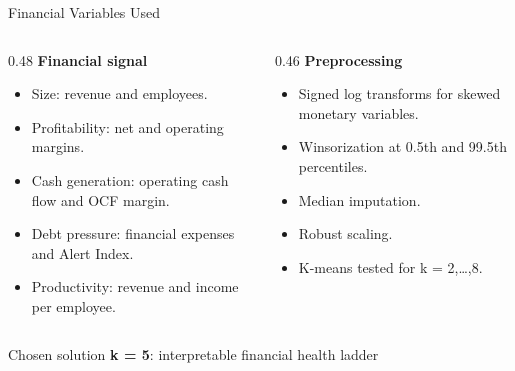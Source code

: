 \documentclass[aspectratio=169,10pt]{beamer}
\begin{document}
\begin{frame}{Financial Variables Used}
  \begin{columns}[T,totalwidth=\textwidth]
    \begin{column}{0.48\textwidth}
      \textbf{Financial signal}
      \begin{itemize}
        \item Size: revenue and employees.
        \item Profitability: net and operating margins.
        \item Cash generation: operating cash flow and OCF margin.
        \item Debt pressure: financial expenses and Alert Index.
        \item Productivity: revenue and income per employee.
      \end{itemize}
    \end{column}
    \begin{column}{0.46\textwidth}
      \textbf{Preprocessing}
      \begin{itemize}
        \item Signed log transforms for skewed monetary variables.
        \item Winsorization at 0.5th and 99.5th percentiles.
        \item Median imputation.
        \item Robust scaling.
        \item K-means tested for k = 2,\dots,8.
      \end{itemize}
    \end{column}
  \end{columns}

  \vspace{0.25cm}
  \begin{block}{Chosen solution}
    \centering
    \Large \textbf{k = 5}: interpretable financial health ladder
  \end{block}
\end{frame}
\end{document}
